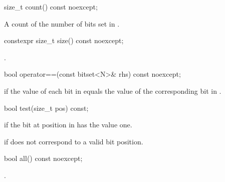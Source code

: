 \begin{indexed}{}
\begin{itemdecl}
size_t count() const noexcept;
\end{itemdecl}
\end{indexed}

\begin{itemdescr}
\pnum
\returns
A count of the number of bits set in
.
\end{itemdescr}

%
\begin{itemdecl}
constexpr size_t size() const noexcept;
\end{itemdecl}

\begin{itemdescr}
\pnum
\returns
{}.
\end{itemdescr}

%
\begin{itemdecl}
bool operator==(const bitset<N>& rhs) const noexcept;
\end{itemdecl}

\begin{itemdescr}
\pnum
\returns
{} if the value of each bit in
equals the value of the corresponding bit in .
\end{itemdescr}

%
\begin{itemdecl}
bool test(size_t pos) const;
\end{itemdecl}

\begin{itemdescr}
\pnum
\returns
{}
if the bit at position 
in
has the value one.

\pnum
\throws
{}%
 if  does not correspond to a valid bit position.
\end{itemdescr}

\begin{indexed}{}
\begin{itemdecl}
bool all() const noexcept;
\end{itemdecl}
\end{indexed}

\begin{itemdescr}
\pnum
\returns
{}.
\end{itemdescr}

